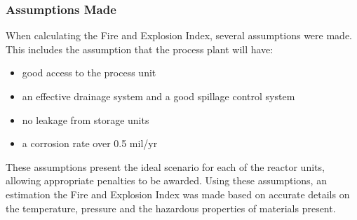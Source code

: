 \subsubsection{Assumptions Made }

When calculating the Fire and Explosion Index, several assumptions were made. This includes the assumption that the process plant will have:
\begin{itemize}
\item good access to the process unit
\item an effective drainage system and a good spillage control system
\item no leakage from storage units 
\item a corrosion rate over 0.5 mil/yr
\end{itemize}

These assumptions present the ideal scenario for each of the reactor units, allowing appropriate penalties to be awarded. Using these assumptions, an estimation the Fire and Explosion Index was made based on accurate details on the temperature, pressure and the hazardous properties of materials present. 

